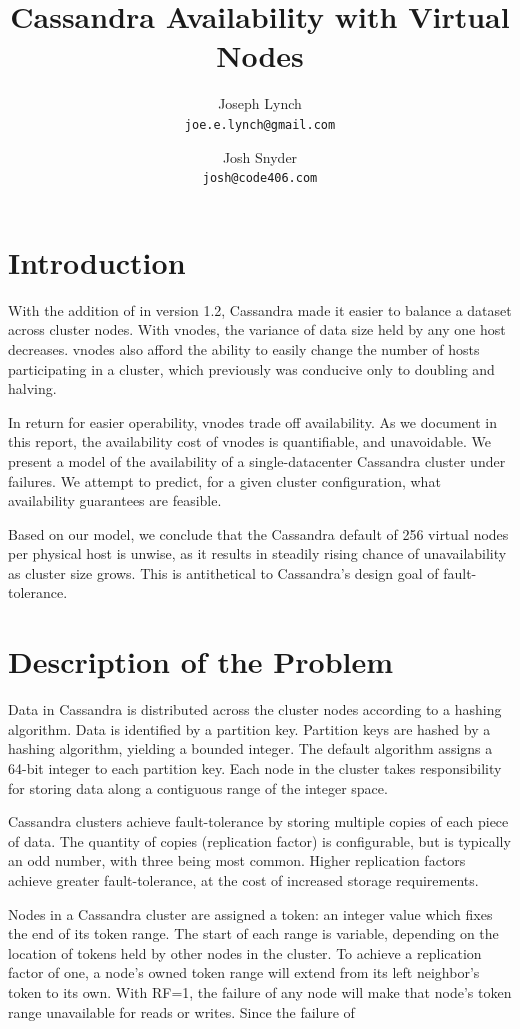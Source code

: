 \documentclass{article}
\title{Cassandra Availability with Virtual Nodes}
\author{
  Joseph Lynch\\
  \texttt{joe.e.lynch@gmail.com}
  \and
  Josh Snyder\\
  \texttt{josh@code406.com}
}
\begin{document}
\maketitle

\section{Introduction}
With the addition of  \cite{vnodes} in version 1.2, Cassandra
made it easier to balance a dataset across cluster nodes. With vnodes, the
variance of data size held by any one host decreases. vnodes also afford the
ability to easily change the number of hosts participating in a cluster, which
previously was conducive only to doubling and halving.

In return for easier operability, vnodes trade off availability. As we document
in this report, the availability cost of vnodes is quantifiable, and
unavoidable. We present a model of the availability of a single-datacenter
Cassandra cluster under failures. We attempt to predict, for a given cluster
configuration, what availability guarantees are feasible.

Based on our model, we conclude that the Cassandra default of 256 virtual nodes
per physical host is unwise, as it results in steadily rising chance of
unavailability as cluster size grows. This is antithetical to Cassandra's
design goal of fault-tolerance.

\section{Description of the Problem}

Data in Cassandra is distributed across the cluster nodes according to a
hashing algorithm. Data is identified by a partition key. Partition keys are
hashed by a hashing algorithm, yielding a bounded integer. The default
algorithm assigns a 64-bit integer to each partition key. Each node in the
cluster takes responsibility for storing data along a contiguous range of the
integer space.

Cassandra clusters achieve fault-tolerance by storing multiple copies of each
piece of data. The quantity of copies (replication factor) is configurable, but
is typically an odd number, with three being most common. Higher replication
factors achieve greater fault-tolerance, at the cost of increased storage
requirements.

Nodes in a Cassandra cluster are assigned a token: an integer value which fixes
the end of its token range. The start of each range is variable, depending on
the location of tokens held by other nodes in the cluster. To achieve a
replication factor of one, a node's owned token range will extend from its left
neighbor's token to its own. With RF=1, the failure of any node will make that
node's token range unavailable for reads or writes. Since the failure of
\end{document}
